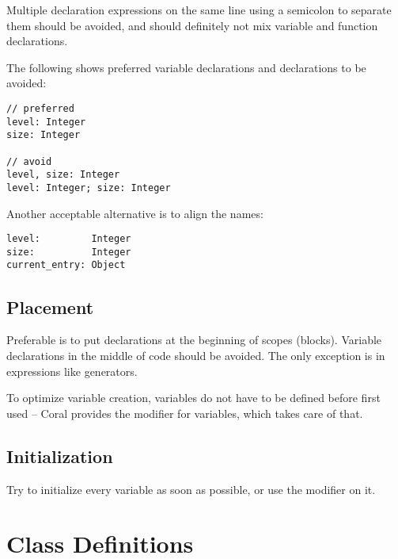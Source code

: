 Multiple declaration expressions on the same line using a semicolon to separate them should be avoided, and should definitely not mix variable and function declarations. 

\example The following shows preferred variable declarations and declarations to be avoided:
\begin{lstlisting}
// preferred
level: Integer
size: Integer

// avoid
level, size: Integer
level: Integer; size: Integer
\end{lstlisting}

\example Another acceptable alternative is to align the names: 
\begin{lstlisting}
level:         Integer
size:          Integer
current_entry: Object
\end{lstlisting}





\subsection{Placement}

Preferable is to put declarations at the beginning of scopes (blocks). Variable declarations in the middle of code should be avoided. The only exception is in expressions like generators. 

To optimize variable creation, variables do not have to be defined before first used -- Coral provides the  modifier for variables, which takes care of that. 





\subsection{Initialization}

Try to initialize every variable as soon as possible, or use the  modifier on it. 






\section{Class Definitions}


